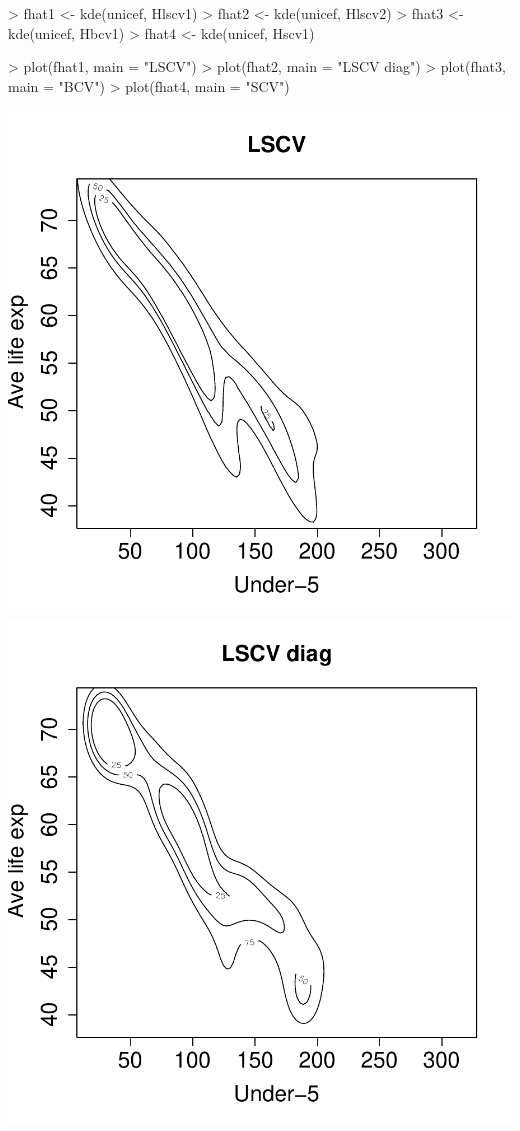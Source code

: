 \documentclass[a4paper,11pt]{article}
\begin{document}
\begin{Schunk}
\begin{Sinput}
> fhat1 <- kde(unicef, Hlscv1)
> fhat2 <- kde(unicef, Hlscv2)
> fhat3 <- kde(unicef, Hbcv1)
> fhat4 <- kde(unicef, Hscv1)
\end{Sinput}
\end{Schunk}
\begin{Schunk}
\begin{Sinput}
> plot(fhat1, main = "LSCV")
> plot(fhat2, main = "LSCV diag")
> plot(fhat3, main = "BCV")
> plot(fhat4, main = "SCV")
\end{Sinput}
\end{Schunk}
\begin{center}
\includegraphics{kde-014}
\includegraphics{kde-015}

\end{center}
\end{document}
